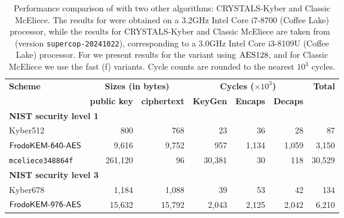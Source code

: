 \begin{table}[t]
\caption{Performance comparison of \FrodoKEM with two other algorithms: CRYSTALS-Kyber and Classic McEliece.
The results for \FrodoKEM were obtained on a 3.2GHz Intel Core i7-8700 (Coffee Lake) processor,
while the results for CRYSTALS-Kyber and Classic McEliece are taken from~\cite{SUPERCOP} (version {\tt supercop-20241022}), corresponding to a
3.0GHz Intel Core i3-8109U (Coffee Lake) processor.
For \FrodoKEM we present results for the variant using $\textrm{\upshape\mdseries AES128}$, and for Classic McEliece we use the fast (f) variants. 
Cycle counts are rounded to the nearest $10^3$ cycles.}\label{tab:comparison}
\scriptsize
\medskip
\centering
\renewcommand{\tabcolsep}{0.25cm}
\renewcommand{\arraystretch}{1.1}
\begin{tabular}{l|r r|r r r|r}
\toprule
\multirow{2}{*}{\textbf{Scheme}}     & \multicolumn{2}{c|}{\textbf{Sizes (in bytes)}} &     \multicolumn{3}{c|}{\textbf{Cycles ($\times 10^3$)}}                     &    \multirow{2}{*}{\textbf{Total}}  \\ 
\cmidrule(lr){2-3} \cmidrule(lr){4-6}
                                     & \textbf{public key} & \textbf{ciphertext}      &      \textbf{KeyGen}       &    \textbf{Encaps}     &    \textbf{Decaps}     &                                     \\
\midrule
\multicolumn{7}{l}{\bf NIST security level 1} \\
\midrule
Kyber512                             &       800  &    768          &             23                &               36                   &                    28         &                   87             \\
$\textsf{\upshape\mdseries FrodoKEM-640-AES}$                   &     9,616  &  9,752          &            957                &            1,134                   &                 1,059         &                3,150             \\
{\tt mceliece348864f}                &   261,120  &     96          &         30,381                &               30                   &                   118         &               30,529             \\
\midrule
\multicolumn{7}{l}{\bf NIST security level 3} \\
\midrule
Kyber678                             &     1,184  &  1,088          &               39              &               53                   &                    42         &                  134             \\
$\textsf{\upshape\mdseries FrodoKEM-976-AES}$                 &    15,632  & 15,792          &            2,043              &            2,125                   &                 2,042         &                6,210             \\

\end{tabular}
\end{table}
